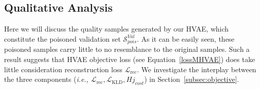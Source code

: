 \section{}
\label{sec:discussion}

\subsection{Qualitative Analysis}
\label{subsec:quality}
Here we will discuss the quality samples generated by our HVAE, which constitute the poisoned validation set $\mathcal{S}^{Val}_{pois}$.
As it can be easily seen, these poisoned samples carry little to no resemblance to the original samples.
Such a result suggests that HVAE objective loss (see Equation~\ref{lossMHVAE}) does take little consideration reconstruction loss $\mathcal{L}_{\mathrm{rec}}$. 
We investigate the interplay between the three components (\textit{i.e., $\mathcal{L}_{\mathrm{rec}}, \mathcal{L}_{\mathrm{KLD}}, Hj_{cost}$}) in Section~\ref{subsec:objective}.

%     

